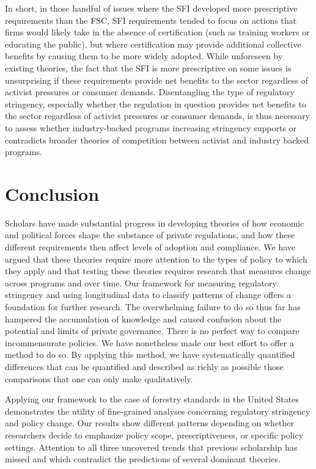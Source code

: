 \documentclass[
      12pt,
            Review ]{article}
\begin{document}
In short, in those handful of issues where the SFI developed more prescriptive requirements than the FSC, SFI requirements tended to focus on actions that firms would likely take in the absence of certification (such as training workers or educating the public), but where certification may provide additional collective benefits by causing them to be more widely adopted. While unforeseen by existing theories, the fact that the SFI is more prescriptive on some issues is unsurprising if these requirements provide net benefits to the sector regardless of activist pressures or consumer demands. Disentangling the type of regulatory stringency, especially whether the regulation in question provides net benefits to the sector regardless of activist pressures or consumer demands, is thus necessary to assess whether industry-backed programs increasing stringency supports or contradicts broader theories of competition between activist and industry backed programs.

\hypertarget{conclusion}{%
\section{Conclusion}\label{conclusion}}

Scholars have made substantial progress in developing theories of how economic and political forces shape the substance of private regulations, and how these different requirements then affect levels of adoption and compliance. We have argued that these theories require more attention to the types of policy to which they apply and that testing these theories requires research that measures change across programs and over time. Our framework for measuring regulatory stringency and using longitudinal data to classify patterns of change offers a foundation for further research. The overwhelming failure to do so thus far has hampered the accumulation of knowledge and caused confusion about the potential and limits of private governance. There is no perfect way to compare incommensurate policies. We have nonetheless made our best effort to offer a method to do so. By applying this method, we have systematically quantified differences that can be quantified and described as richly as possible those comparisons that one can only make qualitatively.

Applying our framework to the case of forestry standards in the United States demonstrates the utility of fine-grained analyses concerning regulatory stringency and policy change. Our results show different patterns depending on whether researchers decide to emphasize policy scope, prescriptiveness, or specific policy settings. Attention to all three uncovered trends that previous scholarship has missed and which contradict the predictions of several dominant theories.
\end{document}
